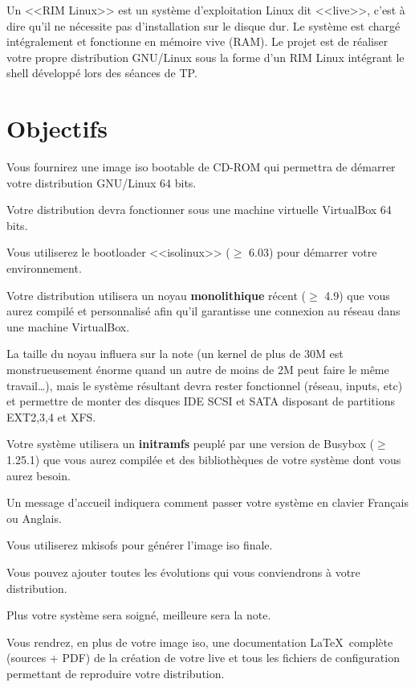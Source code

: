 \documentclass[11pt]{article}
\newcommand{\titreprojet}{RIM : Run In Memory Linux}
\begin{document}
\entete{\titreprojet}

\begin{introduction}
Un <<RIM Linux>> est un système d'exploitation Linux dit <<live>>, c'est à dire qu'il ne nécessite pas d'installation sur le disque dur. Le système est chargé intégralement et fonctionne en mémoire vive (RAM). Le projet est de réaliser votre propre distribution GNU/Linux sous la forme d'un RIM Linux intégrant le shell développé lors des séances de TP.
\end{introduction}


\section*{Objectifs}

Vous fournirez une image iso bootable de CD-ROM qui permettra de démarrer votre distribution GNU/Linux 64 bits.

Votre distribution devra fonctionner sous une machine virtuelle VirtualBox 64 bits.

Vous utiliserez le bootloader <<isolinux>> ($\ge$ 6.03) pour démarrer votre environnement.

Votre distribution utilisera un noyau \textbf{monolithique} récent ($\ge$ 4.9) que vous aurez compilé et personnalisé afin qu'il garantisse une connexion au réseau dans une machine VirtualBox.

La taille du noyau influera sur la note (un kernel de plus de 30M est monstrueusement énorme quand un autre de moins de 2M peut faire le même travail…), mais le système résultant devra rester fonctionnel (réseau, inputs, etc) et permettre de monter des disques IDE SCSI et SATA disposant de partitions EXT2,3,4 et XFS.

Votre système utilisera un \textbf{initramfs} peuplé par une version de Busybox ($\ge$ 1.25.1) que vous aurez compilée et des bibliothèques de votre système dont vous aurez besoin.

Un message d'accueil indiquera comment passer votre système en clavier Français ou Anglais.

Vous utiliserez mkisofs pour générer l'image iso finale.

Vous pouvez ajouter toutes les évolutions qui vous conviendrons à votre distribution.

Plus votre système sera soigné, meilleure sera la note. 

Vous rendrez, en plus de votre image iso, une documentation \LaTeX~complète (sources + PDF) de la création de votre live et tous les fichiers de configuration permettant de reproduire votre distribution.
\end{document}
